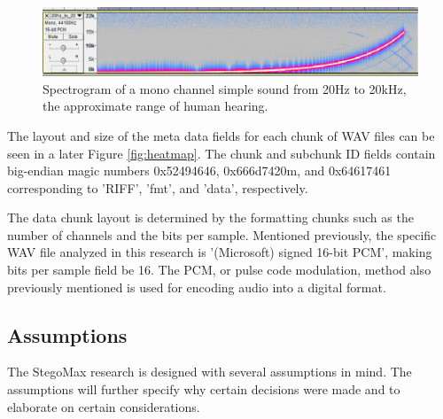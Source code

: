 \documentclass[letterpaper]{article}
\begin{document}
\begin{figure}[ht]
    \includegraphics[width=18cm]{images/humannoise.png}
    \caption{Spectrogram of a mono channel simple sound from 20Hz to 20kHz, the approximate range of human hearing.
 }
    \label{fig:noise}
\end{figure}


The layout and size of the meta data fields for each chunk of WAV files can be seen in a later Figure \ref{fig:heatmap}. The chunk and subchunk ID fields contain big-endian magic numbers 0x52494646, 0x666d7420m, and 0x64617461 corresponding to 'RIFF', 'fmt', and 'data', respectively.  

The data chunk layout is determined by the formatting chunks such as the number of channels and the bits per sample. Mentioned previously, the specific WAV file analyzed in this research is '(Microsoft) signed 16-bit PCM', making bits per sample field be 16. The PCM, or pulse code modulation, method also previously mentioned is used for encoding audio into a digital format. 



\subsection{Assumptions} 
The StegoMax research is designed with several assumptions in mind. The assumptions will further specify why certain decisions were made and to elaborate on certain considerations. 
\end{document}
